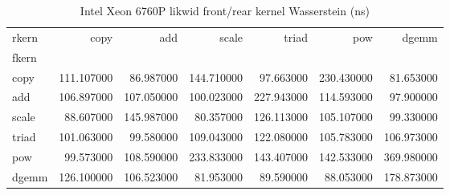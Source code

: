 \begin{table}
\caption{Intel Xeon 6760P likwid front/rear kernel Wasserstein (ns)}
\begin{tabular}{lrrrrrr}
\toprule
rkern & copy & add & scale & triad & pow & dgemm \\
fkern &  &  &  &  &  &  \\
\midrule
copy & 111.107000 & 86.987000 & 144.710000 & 97.663000 & 230.430000 & 81.653000 \\
add & 106.897000 & 107.050000 & 100.023000 & 227.943000 & 114.593000 & 97.900000 \\
scale & 88.607000 & 145.987000 & 80.357000 & 126.113000 & 105.107000 & 99.330000 \\
triad & 101.063000 & 99.580000 & 109.043000 & 122.080000 & 105.783000 & 106.973000 \\
pow & 99.573000 & 108.590000 & 233.833000 & 143.407000 & 142.533000 & 369.980000 \\
dgemm & 126.100000 & 106.523000 & 81.953000 & 89.590000 & 88.053000 & 178.873000 \\
\bottomrule
\end{tabular}
\end{table}

